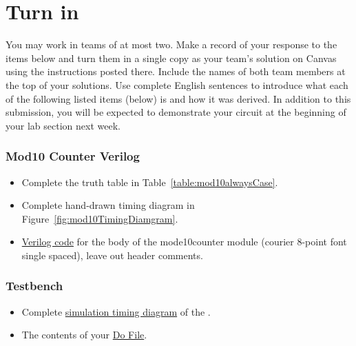 \section{Turn in}

You may work in teams of at most two. Make a record of your response to
the items below and turn them in a single copy as your team's solution
on Canvas using the instructions posted there. Include the names of both
team members at the top of your solutions. Use complete English
sentences to introduce what each of the following listed items (below)
is and how it was derived. In addition to this submission, you will be
expected to demonstrate your circuit at the beginning of your lab
section next week.

\subsubsection{Mod10 Counter Verilog}

\begin{itemize}
\item
  Complete the truth table in Table~\ref{table:mod10alwaysCase}.
\item
 Complete hand-drawn timing diagram in Figure~\ref{fig:mod10TimingDiamgram}.
\item
  \hyperlink{link:mod10Verilog}{Verilog code} for the body of the mode10counter module (courier 8-point
  font single spaced), leave out header comments.
  \end{itemize}
  
\subsubsection{Testbench}
\begin{itemize}
\item
  Complete \hyperlink{link:mod10Simulation}{simulation timing diagram} of the .
\item
  The contents of your   \hyperlink{link:mod10Simulation}{Do File}.
\end{itemize}

